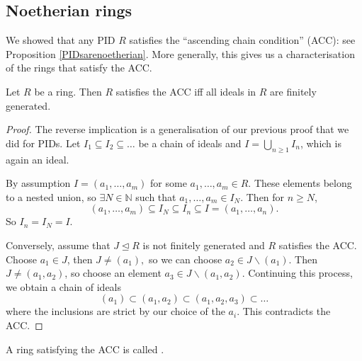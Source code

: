 \documentclass[egregdoesnotlikesansseriftitles,a4paper]{scrartcl}
\begin{document}
\subsection{Noetherian rings}
We showed that any PID $R$ satisfies the ``ascending chain condition'' (ACC): see Proposition \ref{PIDsarenoetherian}. More generally, this gives us a characterisation of the rings that satisfy the ACC.
\begin{lemma}
       Let $R$ be a ring. Then $R$ satisfies the ACC iff all ideals in $R$ are finitely generated.
       \begin{proof}
              The reverse implication is a generalisation of our previous proof that we did for PIDs. Let $I_1 \subseteq I_2 \subseteq \ldots$ be a chain of ideals and $I = \bigcup_{n \geq 1}I_{n}$, which is again an ideal. 

              By assumption $I= (a_1, \ldots, a_m)$ for some $a_1 ,\ldots,a_{m}\in R$. These elements belong to a nested union, so $\exists N \in \mathbb{N}$ such that $a_1 , \ldots, a_m \in I_{N}$. Then for $n \geq N$, \[
              (a_1 ,\ldots, a_m )\subseteq I_{N} \subseteq I_n \subseteq I = (a_1 ,\ldots, a_n )
              .\] So $I_{n}=I_{N}=I$.

              Conversely, assume that $J \unlhd R$ is not finitely generated and $R$ satisfies the ACC. Choose $a_1 \in J$, then $J \neq (a_1 ),$ so we can choose $a_2 \in J\backslash (a_1 )$. Then $J \neq (a_1 ,a_2 )$, so choose an element $a_3 \in J \backslash (a_1 ,a_2 )$. Continuing this process, we obtain a chain of ideals \[
              (a_1 ) \subset (a_1 ,a_2 )\subset (a_1 , a_2 ,a_3 ) \subset \ldots
              \] where the inclusions are strict by our choice of the $a_{i}$. This contradicts the ACC.
       \end{proof}
\end{lemma}
\begin{definition*}
       A ring satisfying the ACC is called .
\end{definition*}
\end{document}

